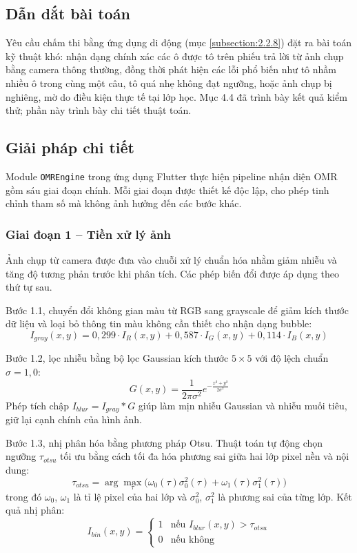 ﻿\documentclass[../DoAn.tex]{subfiles}
\begin{document}
\subsection{Dẫn dắt bài toán}
Yêu cầu chấm thi bằng ứng dụng di động (mục \ref{subsection:2.2.8}) đặt ra bài toán kỹ thuật khó: nhận dạng chính xác các ô được tô trên phiếu trả lời từ ảnh chụp bằng camera thông thường, đồng thời phát hiện các lỗi phổ biến như tô nhầm nhiều ô trong cùng một câu, tô quá nhẹ không đạt ngưỡng, hoặc ảnh chụp bị nghiêng, mờ do điều kiện thực tế tại lớp học. Mục 4.4 đã trình bày kết quả kiểm thử; phần này trình bày chi tiết thuật toán.

\subsection{Giải pháp chi tiết}
Module \texttt{OMREngine} trong ứng dụng Flutter thực hiện pipeline nhận diện OMR gồm sáu giai đoạn chính. Mỗi giai đoạn được thiết kế độc lập, cho phép tinh chỉnh tham số mà không ảnh hưởng đến các bước khác.

\subsubsection{Giai đoạn 1 -- Tiền xử lý ảnh}
Ảnh chụp từ camera được đưa vào chuỗi xử lý chuẩn hóa nhằm giảm nhiễu và tăng độ tương phản trước khi phân tích. Các phép biến đổi được áp dụng theo thứ tự sau.

Bước 1.1, chuyển đổi không gian màu từ RGB sang grayscale để giảm kích thước dữ liệu và loại bỏ thông tin màu không cần thiết cho nhận dạng bubble:
\begin{equation}
    I_{gray}(x,y) = 0{,}299 \cdot I_R(x,y) + 0{,}587 \cdot I_G(x,y) + 0{,}114 \cdot I_B(x,y)
\end{equation}

Bước 1.2, lọc nhiễu bằng bộ lọc Gaussian kích thước $5 \times 5$ với độ lệch chuẩn $\sigma = 1{,}0$:
\begin{equation}
    G(x,y) = \frac{1}{2\pi\sigma^2} e^{-\frac{x^2+y^2}{2\sigma^2}}
\end{equation}
Phép tích chập $I_{blur} = I_{gray} * G$ giúp làm mịn nhiễu Gaussian và nhiễu muối tiêu, giữ lại cạnh chính của hình ảnh.

Bước 1.3, nhị phân hóa bằng phương pháp Otsu. Thuật toán tự động chọn ngưỡng $\tau_{otsu}$ tối ưu bằng cách tối đa hóa phương sai giữa hai lớp pixel nền và nội dung:
\begin{equation}
    \tau_{otsu} = \arg\max_{\tau} \bigl( \omega_0(\tau)\sigma_0^2(\tau) + \omega_1(\tau)\sigma_1^2(\tau) \bigr)
\end{equation}
trong đó $\omega_0$, $\omega_1$ là tỉ lệ pixel của hai lớp và $\sigma_0^2$, $\sigma_1^2$ là phương sai của từng lớp. Kết quả nhị phân:
\begin{equation}
    I_{bin}(x,y) = 
    \begin{cases}
        1 & \text{nếu } I_{blur}(x,y) > \tau_{otsu} \\
        0 & \text{nếu không}
    \end{cases}
\end{equation}
\end{document}

